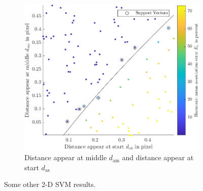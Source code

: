 \begin{figure}
    \ContinuedFloat
    \centering
	\begin{subfigure}[t]{0.8\textwidth}
		\includegraphics[width=\textwidth]{figures/Asso/svm03.png}
		\caption{Distance appear at middle $d_{\mathrm{am}}$ and distance appear at start $d_{\mathrm{as}}$}
	\end{subfigure}
	\caption{Some other 2-D SVM results.}
	\label{effect opt appendix}
\end{figure}







